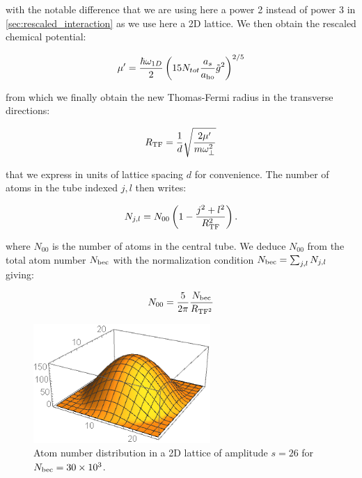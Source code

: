 \noindent with the notable difference that we are using here a power 2 instead of power 3 in \ref{sec:rescaled_interaction} as we use here a 2D lattice. We then obtain the rescaled chemical potential:

\begin{equation}
    \mu' = \frac{\hbar \omega_{1D}}{2} \left( 15 N_{tot} \frac{a_s}{a_{\rm{ho}}} \tilde{g}^2 \right)^{2/5}
\end{equation}

\noindent from which we finally obtain the new Thomas-Fermi radius in the transverse directions:

\begin{equation}
    R_{\rm{TF}} = \frac{1}{d} \sqrt{\frac{2 \mu'}{m \omega_{\perp}^2}}
\end{equation}

\noindent that we express in units of lattice spacing $d$ for convenience. The number of atoms in the tube indexed $j,l$ then writes:

\begin{equation}\label{eq:N_per_tube}
    N_{j,l} = N_{00} \left( 1 - \frac{j^2 + l^2}{R_{\rm{TF}}^2} \right) .
\end{equation}

\noindent where $N_{00}$ is the number of atoms in the central tube. We deduce $N_{00}$ from the total atom number $N_{\rm{bec}}$ with the normalization condition $N_{\rm{bec}} = \sum_{j,l} N_{j,l}$ giving:

\begin{equation}
    N_{00} = \frac{5}{2 \pi} \frac{N_{\rm{bec}}}{R_{\rm{TF}^2}}
\end{equation}

\begin{figure}
    \centering
    \includegraphics[width=0.6\textwidth]{Fig/Chapter5/atomic_distrib_2Dlatt.PNG}
    \caption{Atom number distribution in a 2D lattice of amplitude $s=26$ for $N_{\rm{bec}}=30 \times 10^3$.}
    \label{fig:my_label}
\end{figure}

